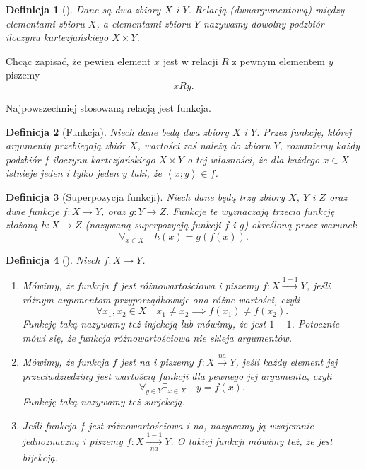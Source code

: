 \documentclass[12pt,a4paper]{report}
\newtheorem{definition}{Definicja}
\newcommand{\parauporzadkowana}[2]{\left\langle {#1}; {#2} \right\rangle}
\begin{document}
\begin{definition}[\citep{kraszewski2007wstkep}]
Dane są dwa zbiory $X$ i $Y$. Relacją (dwuargumentową) między elementami zbioru $X$, a elementami zbioru $Y$ nazywamy dowolny podzbiór iloczynu kartezjańskiego $X \times Y$.
\end{definition}
Chcąc zapisać, że pewien element $x$ jest w relacji $R$ z pewnym elementem $y$ piszemy
$$
xRy.
$$

Najpowszechniej stosowaną relacją jest funkcja.

\begin{definition}[Funkcja\citep{kuratowski1966wstkep}]
Niech dane bedą dwa zbiory $X$ i $Y$. Przez funkcję, której argumenty przebiegają zbiór $X$, wartości zaś należą do zbioru $Y$, rozumiemy każdy podzbiór $f$ iloczynu kartezjańskiego $X \times Y$ o tej własności, że dla każdego $x \in X$ istnieje jeden i tylko jeden $y$ taki, że $\parauporzadkowana{x}{y} \in f$. 

\end{definition}
\begin{definition}[Superpozycja funkcji\citep{kuratowski1966wstkep}]
Niech dane będą trzy zbiory $X$, $Y$ i $Z$ oraz dwie funkcje $f:X\to Y$, oraz $g:Y\to Z$. Funkcje te wyznaczają trzecia funkcję złożoną $h:X\to Z$ (nazywaną superpozycją funkcji $f$ i $g$) określoną przez warunek
\begin{equation*}
\forall_{x \in X} \quad h(x)=g(f(x)).
\end{equation*}
\end{definition}

\begin{definition}[\citep{kraszewski2007wstkep}]
Niech $f:X \to Y$.
\begin{enumerate}
\item
Mówimy, że funkcja $f$ jest różnowartościowa i piszemy $f:X\xrightarrow{1-1} Y$, jeśli różnym argumentom przyporządkowuje ona różne wartości, czyli
\begin{equation*}
\forall{x_{1},x_{2}}\in X \quad x_{1}\ne x_{2} \implies f(x_{1})\ne f(x_{2}).
\end{equation*}
Funkcję taką nazywamy też injekcją lub mówimy, że jest $1-1$. Potocznie mówi się, że funkcja różnowartościowa nie skleja argumentów.
\item
Mówimy, że funkcja $f$ jest na i piszemy $f:X\xrightarrow{na}Y$, jeśli każdy element jej przeciwdziedziny jest wartością funkcji dla pewnego jej argumentu, czyli
\begin{equation*}
\forall_{y\in Y} \exists_{x\in X} \quad y=f(x).
\end{equation*}
Funkcję taką nazywamy też surjekcją.
\item
Jeśli funkcja $f$ jest różnowartościowa i na, nazywamy ją wzajemnie jednoznaczną i piszemy $f:X\xrightarrow[na]{1-1} Y$. O takiej funkcji mówimy też, że jest bijekcją.
\end{enumerate}
\end{definition}
\end{document}
